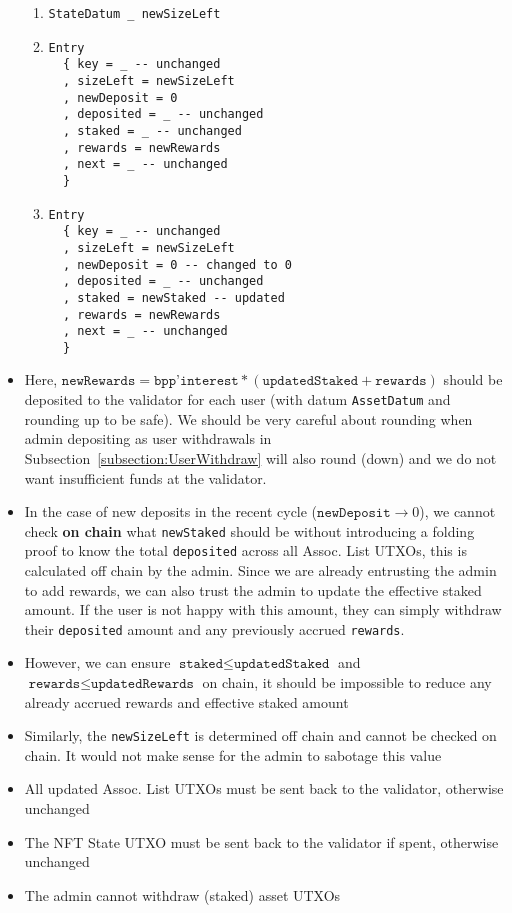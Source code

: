 \documentclass[10pt, a4paper]{article}
\theoremstyle{definition}
\begin{document}
\begin{itemize}
{\begin{enumerate}
\item{\begin{verbatim}
StateDatum _ newSizeLeft
\end{verbatim}
}
\item{
\begin{verbatim}
Entry
  { key = _ -- unchanged
  , sizeLeft = newSizeLeft
  , newDeposit = 0
  , deposited = _ -- unchanged
  , staked = _ -- unchanged
  , rewards = newRewards
  , next = _ -- unchanged
  }  
\end{verbatim}
}
\item{
\begin{verbatim}
Entry
  { key = _ -- unchanged
  , sizeLeft = newSizeLeft
  , newDeposit = 0 -- changed to 0
  , deposited = _ -- unchanged
  , staked = newStaked -- updated
  , rewards = newRewards
  , next = _ -- unchanged
  }  
\end{verbatim}
}
\end{enumerate}

}



\item{Here, $\texttt{newRewards} = \texttt{bpp'interest} * (\texttt{updatedStaked}+ \texttt{rewards})$ should be deposited to the validator for each user (with datum \texttt{AssetDatum} and rounding up to be safe).
We should be very careful about rounding when admin depositing as user withdrawals in Subsection~\ref{subsection:UserWithdraw} will also round (down) and we do not want insufficient funds at the validator.
}
\item{In the case of new deposits in the recent cycle ($\texttt{newDeposit} \rightarrow 0$), we cannot check \textbf{on chain} what \texttt{newStaked} should be without introducing a folding proof to know the total \texttt{deposited} across all Assoc. List UTXOs, this is calculated off chain by the admin. Since we are already entrusting the admin to add rewards, we can also trust the admin to update the effective staked amount. If the user is not happy with this amount, they can simply withdraw their \texttt{deposited} amount and any previously accrued \texttt{rewards}.}
\item{However, we can ensure $\texttt{staked} \leq \texttt{updatedStaked}$ and $\texttt{rewards} \leq \texttt{updatedRewards}$ on chain, it should be impossible to reduce any already accrued rewards and effective staked amount}
\item{Similarly, the \texttt{newSizeLeft} is determined off chain and cannot be checked on chain. It would not make sense for the admin to sabotage this value}
\item{All updated Assoc. List UTXOs must be sent back to the validator, otherwise unchanged}
\item{The NFT State UTXO must be sent back to the validator if spent, otherwise unchanged}
\item{The admin cannot withdraw (staked) asset UTXOs}
\end{itemize}
\end{document}

